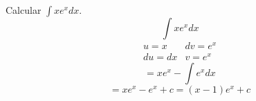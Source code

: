 \documentclass[10pt,twoside]{SelfArx} %
\begin{document}
 \begin{ejemplo}
 	Calcular $ \int xe^{x}dx $.
 	\begin{equation}
 	\int xe^{x}dx
 	\end{equation}
 	\[ 
 	\begin{array}{ll}
 	u=x & dv=e^{x}\\
 	du=dx & v=e^{x}
 	\end{array}
 	\]
 	\begin{equation}
 	=xe^{x}-\int e^{x}dx
 	\end{equation}
 	\begin{equation}
 	=xe^{x}-e^{x}+c=(x-1)e^{x}+c
 	\end{equation}
 \end{ejemplo}
 
 
 
 
 
 
 
 
 
 
 
 
 
 
 
 
 
 
 
 
 
 
 
\end{document}
